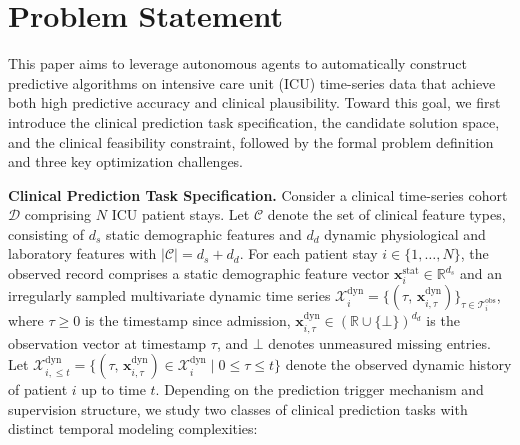 \section{Problem Statement}\label{sec:problem}

This paper aims to leverage autonomous agents to automatically construct predictive algorithms on intensive care unit (ICU) time-series data that achieve both high predictive accuracy and clinical plausibility. Toward this goal, we first introduce the clinical prediction task specification, the candidate solution space, and the clinical feasibility constraint, followed by the formal problem definition and three key optimization challenges.

\textbf{Clinical Prediction Task Specification.} Consider a clinical time-series cohort $\mathcal{D}$ comprising $N$ ICU patient stays. Let $\mathcal{C}$ denote the set of clinical feature types, consisting of $d_s$ static demographic features and $d_d$ dynamic physiological and laboratory features with $|\mathcal{C}| = d_s + d_d$. For each patient stay $i \in \{1, \dots, N\}$, the observed record comprises a static demographic feature vector $\mathbf{x}_i^{\text{stat}} \in \mathbb{R}^{d_s}$ and an irregularly sampled multivariate dynamic time series $\mathcal{X}_i^{\text{dyn}} = \{(\tau,\, \mathbf{x}_{i,\tau}^{\text{dyn}})\}_{\tau \in \mathcal{T}_i^{\text{obs}}}$, where $\tau \ge 0$ is the timestamp since admission, $\mathbf{x}_{i,\tau}^{\text{dyn}} \in (\mathbb{R} \cup \{\bot\})^{d_d}$ is the observation vector at timestamp $\tau$, and $\bot$ denotes unmeasured missing entries. Let $\mathcal{X}_{i, \le t}^{\text{dyn}} = \{(\tau,\, \mathbf{x}_{i,\tau}^{\text{dyn}}) \in \mathcal{X}_i^{\text{dyn}} \mid 0 \le \tau \le t\}$ denote the observed dynamic history of patient $i$ up to time $t$. Depending on the prediction trigger mechanism and supervision structure, we study two classes of clinical prediction tasks with distinct temporal modeling complexities:
